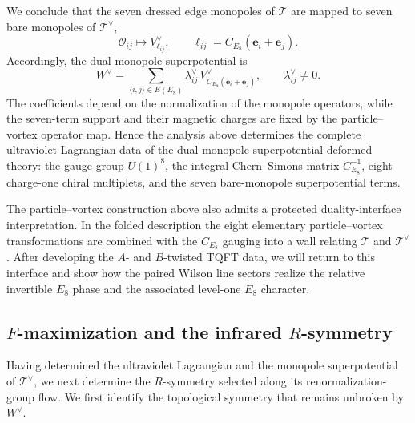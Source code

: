 \documentclass[11pt,a4paper]{article}
\numberwithin{equation}{section}
\begin{document}
We conclude that the seven dressed edge monopoles of $\mathcal T$ are mapped to seven bare monopoles of $\mathcal T^\vee$,
\begin{equation}
  \mathcal O_{ij}
  \longmapsto
  V^\vee_{\boldsymbol\ell_{ij}},
  \qquad
  \boldsymbol\ell_{ij}
  =C_{E_8}(\boldsymbol e_i+\boldsymbol e_j).
  \label{eq:monopole-operator-map}
\end{equation}
Accordingly, the dual monopole superpotential is
\begin{equation}
  W^\vee
  =\sum_{\langle i,j\rangle\in E(E_8)}
  \lambda_{ij}^\vee\,
  V^\vee_{C_{E_8}(\boldsymbol e_i+\boldsymbol e_j)},
  \qquad
  \lambda_{ij}^\vee\neq0.
  \label{eq:dual-monopole-superpotential}
\end{equation}
The coefficients depend on the normalization of the monopole operators, while the seven-term support and their magnetic charges are fixed by the particle--vortex operator map.  Hence the analysis above determines the complete ultraviolet Lagrangian data of the dual monopole-superpotential-deformed theory: the gauge group $U(1)^8$, the integral Chern--Simons matrix $C_{E_8}^{-1}$, eight charge-one chiral multiplets, and the seven bare-monopole superpotential terms.

The particle--vortex construction above also admits a protected duality-interface interpretation.  In the folded description the eight elementary particle--vortex transformations are combined with the $C_{E_8}$ gauging into a wall relating $\mathcal T$ and $\mathcal T^\vee$.  After developing the $A$- and $B$-twisted TQFT data, we will return to this interface and show how the paired Wilson line sectors realize the relative invertible $E_8$ phase and the associated level-one $E_8$ character.


\subsection{$F$-maximization and the infrared $R$-symmetry}
\label{subsec:dual-Fmax}

Having determined the ultraviolet Lagrangian and the monopole superpotential of $\mathcal T^\vee$, we next determine the $R$-symmetry selected along its renormalization-group flow.  We first identify the topological symmetry that remains unbroken by $W^\vee$.
\end{document}
